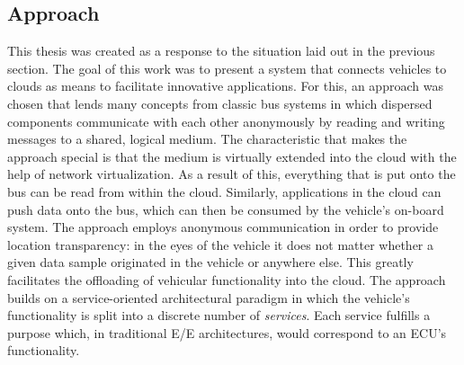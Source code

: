 \subsection{Approach}
This thesis was created as a response to the situation  laid out in the previous section. The goal of this work was to present a system that connects vehicles to clouds as means to facilitate innovative applications. For this, an approach was chosen that lends many concepts from classic bus systems in which dispersed components communicate with each other anonymously by reading and writing messages to a shared, logical medium. The characteristic that makes the approach special is that the medium is virtually extended into the cloud with the help of network virtualization. As a result of this, everything that is put onto the bus can be read from within the cloud. Similarly, applications in the cloud can push data onto the bus, which can then be consumed by the vehicle's on-board system. The approach employs anonymous communication in order to provide location transparency: in the eyes of the vehicle it does not matter whether a given data sample originated in the vehicle or anywhere else. This greatly facilitates the offloading of vehicular functionality into the cloud. The approach builds on a service-oriented architectural paradigm in which the vehicle's functionality is split into a discrete number of \emph{services}. Each service fulfills a purpose which, in traditional E/E architectures, would correspond to an ECU's functionality.

